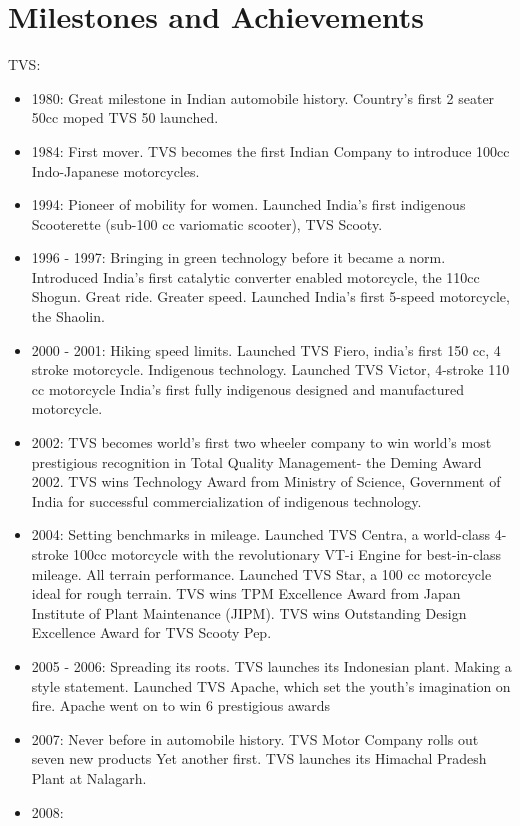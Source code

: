 \section{Milestones and Achievements}
TVS:\\
\begin{itemize}
	\item 1980: Great milestone in Indian automobile history. Country's first 2 seater 50cc moped TVS 50 launched.
	\item 1984: First mover. TVS becomes the first Indian Company to introduce 100cc Indo-Japanese motorcycles.
	\item 1994:	Pioneer of mobility for women. Launched India's first indigenous Scooterette (sub-100 cc variomatic scooter), TVS Scooty.
	\item 1996 - 1997: Bringing in green technology before it became a norm. Introduced India's first catalytic converter enabled motorcycle, the 110cc Shogun. Great ride. Greater speed. Launched India's first 5-speed motorcycle, the Shaolin.
	\item 2000 - 2001: Hiking speed limits. Launched TVS Fiero, india's first 150 cc, 4 stroke motorcycle. Indigenous technology. Launched TVS Victor, 4-stroke 110 cc motorcycle India's first fully indigenous designed and manufactured motorcycle.
	\item 2002:	TVS becomes world's first two wheeler company to win world's most prestigious recognition in Total Quality Management- the Deming Award 2002. TVS wins Technology Award from Ministry of Science, Government of India for successful commercialization of indigenous technology.
	\item 2004:	Setting benchmarks in mileage. Launched TVS Centra, a world-class 4-stroke 100cc motorcycle with the revolutionary VT-i Engine for best-in-class mileage.
	All terrain performance. Launched TVS Star, a 100 cc motorcycle ideal for rough terrain.
	TVS wins TPM Excellence Award from Japan Institute of Plant Maintenance (JIPM).
	TVS wins Outstanding Design Excellence Award for TVS Scooty Pep.
	\item 2005 - 2006: Spreading its roots. TVS launches its Indonesian plant.
	Making a style statement. Launched TVS Apache, which set the youth's imagination on fire. Apache went on to win 6 prestigious awards
	\item 2007:
	Never before in automobile history. TVS Motor Company rolls out seven new products
	Yet another first. TVS launches its Himachal Pradesh Plant at Nalagarh.
	\item 2008:

\end{itemize}

